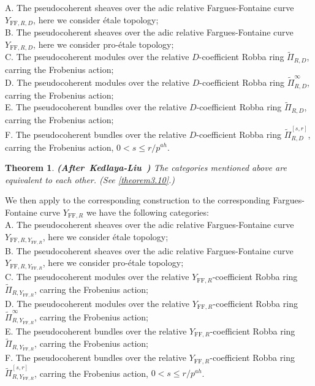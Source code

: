 \documentclass[12pt]{amsart}
\newtheorem{theorem}{Theorem}[section]
\theoremstyle{definition}
\numberwithin{equation}{section}
\begin{document}
\noindent A. The pseudocoherent sheaves over the adic relative Fargues-Fontaine curve $Y_{\mathrm{FF},R,D}$, here we consider \'etale topology;\\
\noindent B. The pseudocoherent sheaves over the adic relative Fargues-Fontaine curve $Y_{\mathrm{FF},R,D}$, here we consider pro-\'etale topology;\\
\noindent C. The pseudocoherent modules over the relative $D$-coefficient Robba ring $\widetilde{\Pi}_{R,D}$, carring the Frobenius action;\\
\noindent D. The pseudocoherent modules over the relative $D$-coefficient Robba ring $\widetilde{\Pi}^\infty_{R,D}$, carring the Frobenius action;\\ 
\noindent E. The pseudocoherent bundles over the relative $D$-coefficient Robba ring $\widetilde{\Pi}_{R,D}$, carring the Frobenius action;\\
\noindent F. The pseudocoherent bundles over the relative $D$-coefficient Robba ring $\widetilde{\Pi}^{[s,r]}_{R,D}$, carring the Frobenius action, $0<s\leq r/p^{ah}$.

\begin{theorem}\mbox{\bf{(After Kedlaya-Liu \cite[Theorem 4.6.1]{KL2})}}
The categories mentioned above are equivalent to each other. (See \cref{theorem3.10}.)
	
\end{theorem}


\indent We then apply to the corresponding construction to the corresponding Fargues-Fontaine curve $Y_{\mathrm{FF},R}$ we have the following categories:\\

\noindent A. The pseudocoherent sheaves over the adic relative Fargues-Fontaine curve $Y_{\mathrm{FF},R,Y_{\mathrm{FF},R}}$, here we consider \'etale topology;\\
\noindent B. The pseudocoherent sheaves over the adic relative Fargues-Fontaine curve $Y_{\mathrm{FF},R,Y_{\mathrm{FF},R}}$, here we consider pro-\'etale topology;\\
\noindent C. The pseudocoherent modules over the relative $Y_{\mathrm{FF},R}$-coefficient Robba ring $\widetilde{\Pi}_{R,Y_{\mathrm{FF},R}}$, carring the Frobenius action;\\
\noindent D. The pseudocoherent modules over the relative $Y_{\mathrm{FF},R}$-coefficient Robba ring $\widetilde{\Pi}^\infty_{R,Y_{\mathrm{FF},R}}$, carring the Frobenius action;\\ 
\noindent E. The pseudocoherent bundles over the relative $Y_{\mathrm{FF},R}$-coefficient Robba ring $\widetilde{\Pi}_{R,Y_{\mathrm{FF},R}}$, carring the Frobenius action;\\
\noindent F. The pseudocoherent bundles over the relative $Y_{\mathrm{FF},R}$-coefficient Robba ring $\widetilde{\Pi}^{[s,r]}_{R,Y_{\mathrm{FF},R}}$, carring the Frobenius action, $0<s\leq r/p^{ah}$.
\end{document}
